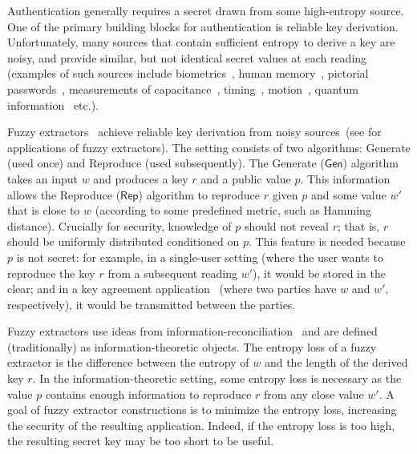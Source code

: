 \documentclass[11pt]{article}
\newcommand{\class}[1]{{\ensuremath{\mathsf{#1}}}}
\newcommand{\gen}{\ensuremath{\class{Gen}}\xspace}
\newcommand{\rep}{\ensuremath{\class{Rep}}\xspace}
\begin{document}
Authentication generally requires a secret drawn from some high-entropy source.  One of the primary building blocks for authentication is reliable key derivation.  Unfortunately, many sources that contain sufficient entropy to derive a key are  noisy, and provide similar, but not identical secret values at each reading (examples of such sources include biometrics~\cite{daugman2004}, human memory~\cite{zviran1993comparison}, pictorial passwords~\cite{brostoff2000passfaces}, measurements of capacitance~\cite{tuyls2006puf}, timing~\cite{suh2007physical}, motion~\cite{castelluccia2005shake},  quantum information~\cite{bennett1988privacy} etc.).  %

Fuzzy extractors~\cite{DBLP:journals/siamcomp/DodisORS08} achieve reliable key derivation from noisy sources~(see \cite{Boyen05secureremote,dodisWichs2009,chandran2010privacy} for applications of fuzzy extractors).  The setting 
consists of  two algorithms: Generate (used once) and Reproduce (used subsequently).  The Generate ($\gen$) algorithm takes an input $w$ and produces a key $r$ and a public value $p$.  This information allows
the Reproduce ($\rep$) algorithm to reproduce $r$ given $p$ and some value $w'$ that is close to $w$ (according to some predefined metric, such as Hamming distance). 
Crucially for security,  knowledge of $p$ should not reveal $r$; that is, $r$ should be uniformly distributed conditioned on $p$.  This feature is needed because $p$ is not secret: for example, in a single-user setting (where the user wants to reproduce the key $r$ from a subsequent reading $w'$), it would be stored in the clear; and in a key agreement application~\cite{Boyen05secureremote} (where two parties have $w$ and $w'$, respectively), it would be transmitted between the parties.

Fuzzy extractors use ideas from information-reconciliation~\cite{bennett1988privacy} and are defined (traditionally) as information-theoretic objects.  The entropy loss of a fuzzy extractor is the difference between the entropy of $w$ and the length of the derived key $r$.  In the information-theoretic setting, some entropy loss is necessary as the value $p$ contains enough information to reproduce $r$ from any close value $w'$. 
A goal of fuzzy extractor constructions is to minimize the entropy loss, increasing the security of the resulting application.  Indeed, if the entropy loss is too high, the resulting secret key may be too short to be useful. 
\end{document}
